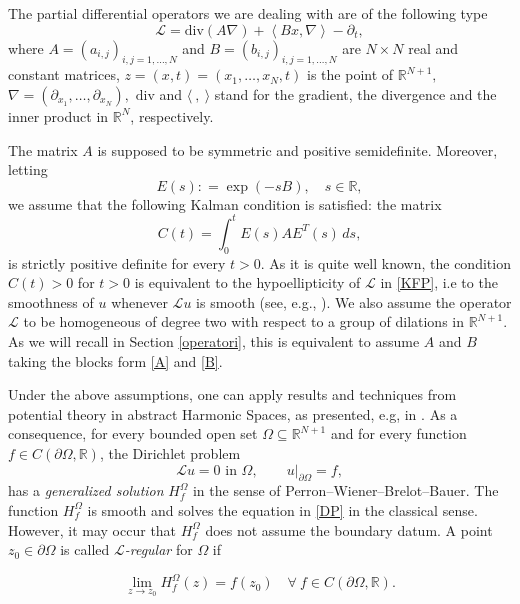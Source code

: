 \documentclass[10pt]{amsart}
\def\elle{\mathcal{L}}
\def\erre{\mathbb{R}}
\def\erreu{{\erre^{ {N+1} }}}
\newcommand{\tende}{\rightarrow}
\numberwithin{equation}{section}
\begin{document}
The partial differential operators we are dealing with are of the following type
\begin{equation}\label{KFP}
\elle = \mathrm{div}\left(  A\nabla\right)  +\left\langle B x,\nabla\right\rangle - \partial_t,
\end{equation}
where $A = (a_{i,j})_{i,j = 1, \dots , N}$ and $B= (b_{i,j})_{i,j = 1, \dots , N}$ are $N\times N$ real and constant matrices,  $z=(x,t)=(x_1, \ldots, x_N, t)$ is the point of $\erre^{N+1},$ $\nabla=(\partial_{x_1}, \ldots, \partial_{x_N}),$  $\mathrm{div}$ and $\langle\ , \ \rangle$ stand for the gradient, the divergence and the inner product in 
$\erre^{N}$, respectively.


The matrix $A$ is supposed to be symmetric and positive semidefinite. Moreover, letting
$$E(s): =\exp\left(-sB\right),\quad s\in\erre,$$
we assume that the following Kalman condition is satisfied: the matrix 
$$C(t)=\int_{0}^{t} E(s)AE^T(s)\,ds,$$
 is strictly positive definite for every $t>0$. As it is quite well known, the condition $C(t)>0$ for $t>0$ is equivalent to the hypoellipticity of $\elle$ in \eqref{KFP}, i.e to the smoothness of $u$ whenever $\elle u$ is smooth (see, e.g., \cite{LP}).  We also assume the operator $\elle$ to be homogeneous of degree two with respect to a group of dilations in $\erreu$. As we will recall in Section \ref{operatori}, this is equivalent to assume $A$ and $B$ taking the blocks form \eqref{A} and \eqref{B}.
 
 Under the above assumptions, one can apply results and techniques from potential theory in abstract Harmonic Spaces, as presented, e.g, in \cite{Cin}.  As a consequence, for every bounded open set $\Omega\subseteq \erreu$ and for every function $f\in C(\partial\Omega,\erre)$, the Dirichlet problem 
 \begin{equation}\label{DP} 
 \elle   u= 0 \mbox{ in } \Omega, \qquad 
  u|_{\partial \Omega} = f, 
\end{equation}
has a {\it generalized solution} $H_f^\Omega$ in the sense of Perron--Wiener--Brelot--Bauer. The function $H_f^\Omega$ is smooth and solves the equation in \eqref{DP} in the classical sense. However, it may occur that $H_f^\Omega$ does not assume the boundary datum. A point $z_0\in\partial\Omega$ is called {\it $\elle$-regular} for $\Omega$ if 

$$\lim_{z\tende z_0} H_f^\Omega(z)=f (z_0)\quad\forall\ f \in C(\partial\Omega, \erre).$$ 
\end{document}
